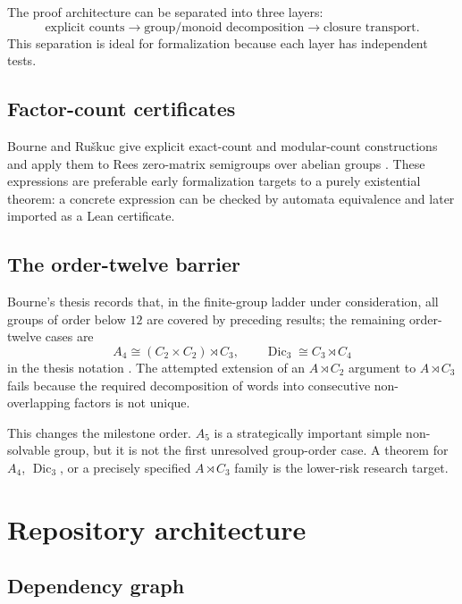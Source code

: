 \documentclass{amsart}
\begin{document}
The proof architecture can be separated into three layers:
\[
\boxed{\text{explicit counts}}
\longrightarrow
\boxed{\text{group/monoid decomposition}}
\longrightarrow
\boxed{\text{closure transport}}.
\]
This separation is ideal for formalization because each layer has independent tests.

\subsection{Factor-count certificates}

Bourne and Ru\v{s}kuc give explicit exact-count and modular-count constructions and apply them to Rees zero-matrix semigroups over abelian groups \cite{bourneRuskuc2016}.  These expressions are preferable early formalization targets to a purely existential theorem: a concrete expression can be checked by automata equivalence and later imported as a Lean certificate.

\subsection{The order-twelve barrier}

Bourne's thesis records that, in the finite-group ladder under consideration, all groups of order below $12$ are covered by preceding results; the remaining order-twelve cases are
\[
  A_4\cong (C_2\times C_2)\rtimes C_3,
  \qquad
  \operatorname{Dic}_3\cong C_3\rtimes C_4
\]
in the thesis notation \cite{bourne2017counting}.  The attempted extension of an $A\rtimes C_2$ argument to $A\rtimes C_3$ fails because the required decomposition of words into consecutive non-overlapping factors is not unique.

This changes the milestone order.  $A_5$ is a strategically important simple non-solvable group, but it is not the first unresolved group-order case.  A theorem for $A_4$, $\operatorname{Dic}_3$, or a precisely specified $A\rtimes C_3$ family is the lower-risk research target.

\section{Repository architecture}

\subsection{Dependency graph}
\end{document}
